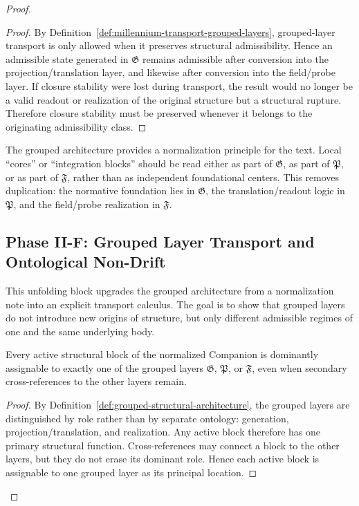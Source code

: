 \begin{proof}
\begin{proof}
By Definition~\ref{def:millennium-transport-grouped-layers}, grouped-layer
transport is only allowed when it preserves structural admissibility. Hence an
admissible state generated in $\mathfrak G$ remains admissible after conversion
into the projection/translation layer, and likewise after conversion into the
field/probe layer. If closure stability were lost during transport, the result
would no longer be a valid readout or realization of the original structure but
a structural rupture. Therefore closure stability must be preserved whenever it
belongs to the originating admissibility class.
\end{proof}

\begin{remark}
\label{rem:document-normalization-consequence}
The grouped architecture provides a normalization principle for the text. Local
``cores'' or ``integration blocks'' should be read either as part of
$\mathfrak G$, as part of $\mathfrak P$, or as part of $\mathfrak F$, rather than as
independent foundational centers. This removes duplication: the normative
foundation lies in $\mathfrak G$, the translation/readout logic in $\mathfrak P$,
and the field/probe realization in $\mathfrak F$.
\end{remark}

\subsection*{Phase II-F: Grouped Layer Transport and Ontological Non-Drift}

This unfolding block upgrades the grouped architecture from a normalization note
into an explicit transport calculus. The goal is to show that grouped layers do
not introduce new origins of structure, but only different admissible regimes of
one and the same underlying body.

\begin{lemma}
\label{lem:group-decomposition}
Every active structural block of the normalized Companion is dominantly
assignable to exactly one of the grouped layers $\mathfrak G$, $\mathfrak P$, or
$\mathfrak F$, even when secondary cross-references to the other layers remain.
\end{lemma}

\begin{proof}
By Definition~\ref{def:grouped-structural-architecture}, the grouped layers are
distinguished by role rather than by separate ontology: generation,
projection/translation, and realization. Any active block therefore has one
primary structural function. Cross-references may connect a block to the other
layers, but they do not erase its dominant role. Hence each active block is
assignable to one grouped layer as its principal location.
\end{proof}


\end{proof}
